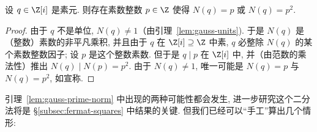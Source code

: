 \begin{lemma}\label{lem:gauss-prime-norm}
设 $q\in\Z[i]$ 是素元. 则存在素数整数 $p\in\Z$ 使得 $N(q)=p$ 或 $N(q)=p^2$.
\end{lemma}

\begin{proof}
由于 $q$ 不是单位, $N(q)\neq 1$（由引理~\ref{lem:gauss-units}). 于是 $N(q)$ 是（整数）素数的非平凡乘积, 并且由于 $q$ 在 $\Z[i]\supseteq\Z$ 中素, $q$ 必整除 $N(q)$ 的某个素数整数因子; 设 $p$ 是这个整数素数. 但于是 $q\mid p$ 在 $\Z[i]$ 中, 并（由范数的乘法性）推出 $N(q)\mid N(p)=p^2$. 由于 $N(q)\neq 1$, 唯一可能是 $N(q)=p$ 与 $N(q)=p^2$, 如宣称.
\end{proof}

引理~\ref{lem:gauss-prime-norm} 中出现的两种可能性都会发生, 进一步研究这个二分法将是 \S\ref{subsec:fermat-squares} 中结果的关键. 但我们已经可以``手工''算出几个情形:

